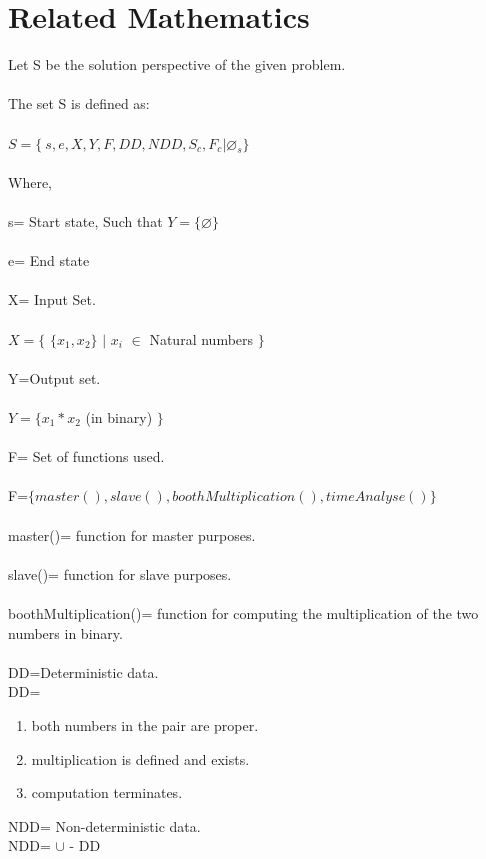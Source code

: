\documentclass[10pt,a4paper]{article}
\begin{document}
\section{Related Mathematics}
Let S be the solution perspective of the given problem.
\\\\The set S is defined as:
\\\\$S=\lbrace\ s,e,X,Y,F,DD,NDD,S_{c},F_{c}|\varnothing_{s}\rbrace$
\\\\Where,
\\\\s= Start state,  Such that $Y=\lbrace \varnothing \rbrace$ 
\\\\e= End state 
\\\\X= Input Set.
\\\\$X=\lbrace$ $\lbrace x_1, x_2 \rbrace$ $\mid$ $x_i$ $\in$ Natural numbers $\rbrace$
\\\\Y=Output set.
\\\\$Y=\lbrace x_1 * x_2 $ (in binary) $ \rbrace $
\\\\F= Set of functions used.
\\\\F=$\lbrace master(), slave(), boothMultiplication(), timeAnalyse()\rbrace$
\\\\master()= function for master purposes.
\\\\slave()= function for slave purposes.
\\\\boothMultiplication()= function for computing the multiplication of the two numbers in binary.
\\\\DD=Deterministic data.
\\DD=
\begin{enumerate}
\item both numbers in the pair are proper.
\item multiplication is defined and exists.
\item computation terminates.
\end{enumerate}
NDD= Non-deterministic data.
\\NDD= $\cup$ - DD
\end{document}
